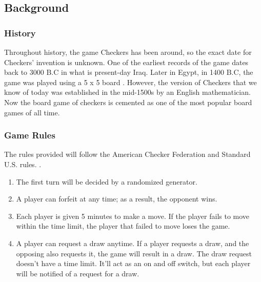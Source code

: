 \documentclass[10pt]{article}
\begin{document}
\subsection{Background}

\subsubsection{History}

Throughout history, the game Checkers has been around, so the exact date for Checkers' 
invention is unknown. One of the earliest records of the game dates back to 3000 B.C in what 
is present-day Iraq. Later in Egypt, in 1400 B.C, the game was played using a 5 x 5 board \cite{historyCheckers}. 
However, the version of Checkers that we know of today was established in the mid-1500s by an English mathematician. 
Now the board game of checkers is cemented as one of the most popular board games of all time. 
\subsubsection{Game Rules}
    The rules provided will follow the American Checker Federation and Standard U.S. rules. \cite {checkersFoundation}.
    \begin{enumerate}
    \item The first turn will be decided by a randomized generator.
    \item A player can forfeit at any time; as a result, the opponent wins.
    \item Each player is given 5 minutes to make a move. If the player fails to move within the time limit, the player that failed to move loses the game.
    \item A player can request a draw anytime. If a player requests a draw, and the opposing also requests it, the game will result in a draw. The draw request doesn’t have a time limit. It’ll act as an on and off switch, but each player will be notified of a request for a draw.
    \end{enumerate}
\end{document}
